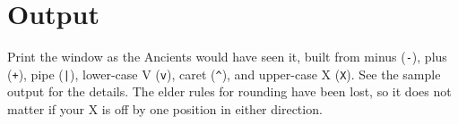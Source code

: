 \section*{Output}

Print the window as the Ancients would have seen it, built from minus (\verb!-!), plus (\verb!+!), pipe (\verb!|!), lower-case V (\verb!v!), caret (\verb!^!), and upper-case X (\verb!X!).
See the sample output for the details.
The elder rules for rounding have been lost, so it does not matter if your X is off by one position in either direction.
